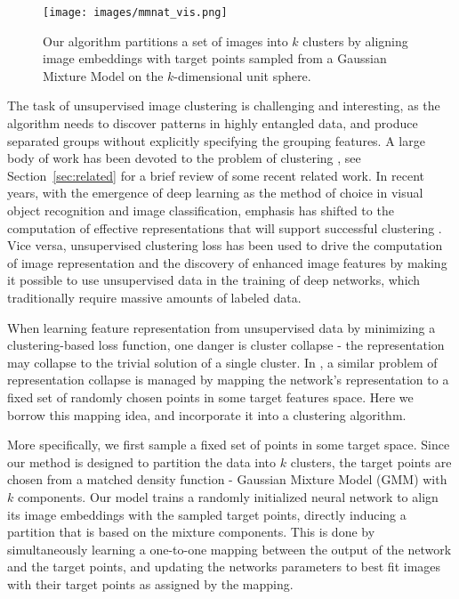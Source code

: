 \documentclass[a4paper,conference]{IEEEtran}
\begin{document}
\begin{figure}[t]
\begin{center}
   \texttt{[image: images/mmnat\_vis.png]}
   \vspace{-.3in}
\end{center}
   \caption{Our algorithm partitions a set of images into $k$ clusters by aligning image embeddings with target points sampled from a Gaussian Mixture Model on the $k$-dimensional unit sphere. }
   \vspace{-.142in}
\label{fig:mmnat_vis}
\end{figure}

The task of unsupervised image clustering is challenging and interesting, as the algorithm needs to discover patterns in highly entangled data, and produce separated groups without explicitly specifying the grouping features. A large body of work has been devoted to the problem of clustering \cite{jain1999data}, see Section~\ref{sec:related} for a brief review of some recent related work. In recent years, with the emergence of deep learning as the method of choice in visual object recognition and image classification, emphasis has shifted to the computation of effective representations that will support successful clustering \cite{min2018survey}. Vice versa, unsupervised clustering loss has been used to drive the computation of image representation and the discovery of enhanced image features by making it possible to use unsupervised data in the training of deep networks, which traditionally require massive amounts of labeled data.

When learning feature representation from unsupervised data by minimizing a clustering-based loss function, one danger is cluster collapse - the representation may collapse to the trivial solution of a single cluster. In \cite{BJ2017}, a similar problem of representation collapse is managed by mapping the network's representation to a fixed set of randomly chosen points in some target features space. Here we borrow this mapping idea, and incorporate it into a clustering algorithm. 

More specifically, we first sample a fixed set of points in some target space. Since our method is designed to partition the data into $k$ clusters, 
the target points are chosen from a matched density function - Gaussian Mixture Model (GMM) with $k$ components. Our model trains a randomly initialized neural network to align its image embeddings with the sampled target points, directly inducing a partition that is based on the mixture components. This is done by simultaneously learning a one-to-one mapping between the output of the network and the target points, and updating the networks parameters to best fit images with their target points as assigned by the mapping.
\end{document}

